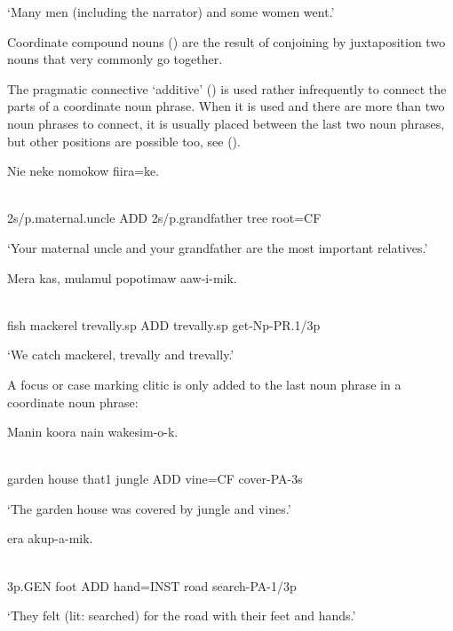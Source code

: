 `Many men (including the narrator) and some women went.'

Coordinate compound nouns () are the result of conjoining by juxtaposition two nouns that very commonly go together. 

The pragmatic connective  `additive' () is used rather infrequently to connect the parts of a coordinate noun phrase. When it is used and there are more than two noun phrases to connect, it is usually placed between the last two noun phrases, but other positions are possible too, see (). 

\ea%
\label{ex:x812}
\gll Nie    neke  nomokow  fiira=ke. \\
      \\
\glt
\z

2s/p.maternal.uncle  ADD  2s/p.grandfather  tree  root=CF

`Your maternal uncle and your grandfather are the most important relatives.'

\ea%
\label{ex:x814}
\gll Mera  kas,  mulamul    popotimaw  aaw-i-mik. \\
      \\
\glt
\z

fish  mackerel  trevally.sp  ADD  trevally.sp  get-Np-PR.1/3p

`We catch mackerel,   trevally and   trevally.'

A focus or case marking clitic is only added to the last noun phrase in a coordinate noun phrase:

\ea%
\label{ex:x893}
\gll Manin  koora  nain    wakesim-o-k. \\
      \\
\glt
\z

garden  house  that1  jungle  ADD  vine=CF  cover-PA-3s

`The garden house was covered by jungle and vines.'

\ea%
\label{ex:x894}
\gll {}  era  akup-a-mik. \\
      \\
\glt
\z

3p.GEN  foot  ADD  hand=INST  road  search-PA-1/3p

`They felt (lit: searched) for the road with their feet and hands.'

